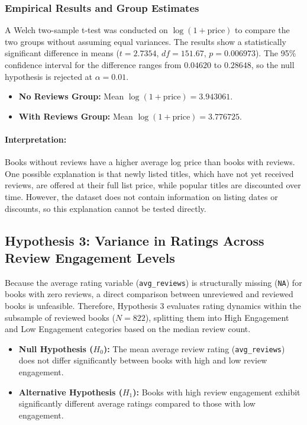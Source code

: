 \documentclass[11pt,a4paper]{article}
\begin{document}
\subsubsection*{Empirical Results and Group Estimates}

A Welch two-sample t-test was conducted on $\log(1 + \text{price})$ to compare the two groups without assuming equal variances. The results show a statistically significant difference in means ($t = 2.7354$, $df = 151.67$, $p = 0.006973$). The 95\% confidence interval for the difference ranges from $0.04620$ to $0.28648$, so the null hypothesis is rejected at $\alpha = 0.01$.

\begin{itemize}
    \item \textbf{No Reviews Group:} Mean $\log(1 + \text{price}) = 3.943061$.

    \item \textbf{With Reviews Group:} Mean $\log(1 + \text{price}) = 3.776725$.
\end{itemize}

\paragraph{Interpretation:} Books without reviews have a higher average log price than books with reviews. One possible explanation is that newly listed titles, which have not yet received reviews, are offered at their full list price, while popular titles are discounted over time. However, the dataset does not contain information on listing dates or discounts, so this explanation cannot be tested directly.

\newpage
\subsection{Hypothesis 3: Variance in Ratings Across Review Engagement Levels}

Because the average rating variable (\texttt{avg\_reviews}) is structurally missing (\texttt{NA}) for books with zero reviews, a direct comparison between unreviewed and reviewed books is unfeasible. Therefore, Hypothesis 3 evaluates rating dynamics within the subsample of reviewed books ($N = 822$), splitting them into High Engagement and Low Engagement categories based on the median review count.

\begin{itemize}
    \item \textbf{Null Hypothesis ($H_0$):} The mean average review rating (\texttt{avg\_reviews}) does not differ significantly between books with high and low review engagement.

    \item \textbf{Alternative Hypothesis ($H_1$):} Books with high review engagement exhibit significantly different average ratings compared to those with low engagement.
\end{itemize}
\end{document}
